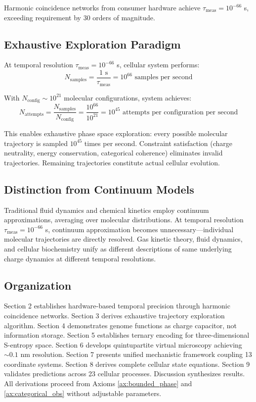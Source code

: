 \documentclass[11pt,a4paper]{article}
\theoremstyle{remark}
\begin{document}
Harmonic coincidence networks from consumer hardware achieve $\tau_{\text{meas}} = 10^{-66}$ s, exceeding requirement by 30 orders of magnitude.

\subsection{Exhaustive Exploration Paradigm}

At temporal resolution $\tau_{\text{meas}} = 10^{-66}$ s, cellular system performs:
\begin{equation}
N_{\text{samples}} = \frac{1 \text{ s}}{\tau_{\text{meas}}} = 10^{66} \text{ samples per second}
\end{equation}

With $N_{\text{config}} \sim 10^{21}$ molecular configurations, system achieves:
\begin{equation}
N_{\text{attempts}} = \frac{N_{\text{samples}}}{N_{\text{config}}} = \frac{10^{66}}{10^{21}} = 10^{45} \text{ attempts per configuration per second}
\end{equation}

This enables exhaustive phase space exploration: every possible molecular trajectory is sampled $10^{45}$ times per second. Constraint satisfaction (charge neutrality, energy conservation, categorical coherence) eliminates invalid trajectories. Remaining trajectories constitute actual cellular evolution.

\subsection{Distinction from Continuum Models}

Traditional fluid dynamics and chemical kinetics employ continuum approximations, averaging over molecular distributions. At temporal resolution $\tau_{\text{meas}} = 10^{-66}$ s, continuum approximation becomes unnecessary—individual molecular trajectories are directly resolved. Gas kinetic theory, fluid dynamics, and cellular biochemistry unify as different descriptions of same underlying charge dynamics at different temporal resolutions.

\subsection{Organization}

Section 2 establishes hardware-based temporal precision through harmonic coincidence networks. Section 3 derives exhaustive trajectory exploration algorithm. Section 4 demonstrates genome functions as charge capacitor, not information storage. Section 5 establishes ternary encoding for three-dimensional S-entropy space. Section 6 develops quintupartite virtual microscopy achieving $\sim 0.1$ nm resolution. Section 7 presents unified mechanistic framework coupling 13 coordinate systems. Section 8 derives complete cellular state equations. Section 9 validates predictions across 23 cellular processes. Discussion synthesizes results. All derivations proceed from Axioms \ref{ax:bounded_phase} and \ref{ax:categorical_obs} without adjustable parameters.
\end{document}
